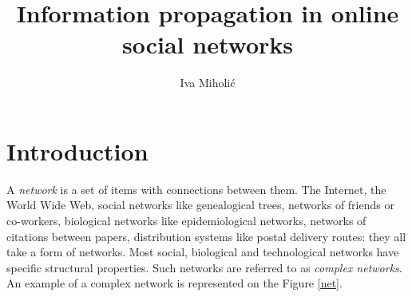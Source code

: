 \documentclass[times, utf8, zavrsni]{fer}
\begin{document}

\title{Information propagation in online social networks}

\author{Iva Miholić}

\maketitle

\zahvala{}

\tableofcontents
\clearpage
\listoffigures
\listoftables

\chapter{Introduction}

A \emph{network} is a set of items with connections between them. The Internet, the World Wide Web, social networks like genealogical trees, networks of friends or co-workers, biological networks like epidemiological networks, networks of citations between papers, distribution systems like postal delivery routes: they all take a form of networks. Most social, biological and technological networks have specific structural properties. Such networks are referred to as \emph{complex networks}.  An example of a complex network is represented on the Figure \ref{net}.
\end{document}
